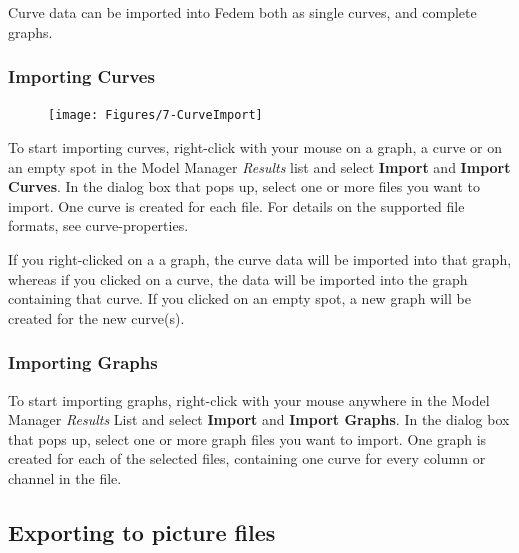 


Curve data can be imported into Fedem both as single curves,
and complete graphs.

\subsubsection{Importing Curves}

\begin{figure}
  \vspace{-10mm}
  \texttt{[image: Figures/7-CurveImport]}
\end{figure}

To start importing curves, right-click with your mouse on a graph, a curve
or on an empty spot in the Model Manager {\sl Results} list and select
\textbf{Import} and \textbf{Import Curves}. In the dialog box that pops
up, select one or more files you want to import. One curve is created
for each file. For details on the supported file formats, see
              {curve-properties}.

If you right-clicked on a a graph, the curve data will be imported into
that graph, whereas if you clicked on a curve, the data will be imported
into the graph containing that curve. If you clicked on an empty spot, a
new graph will be created for the new curve(s).

\subsubsection{Importing Graphs}

To start importing graphs, right-click with your mouse anywhere in the
Model Manager {\sl Results} List and select \textbf{Import} and
\textbf{Import Graphs}. In the dialog box that pops up, select one or more graph
files you want to import. One graph is created for each of the selected files,
containing one curve for every column or channel in the file.


\subsection{Exporting to picture files}

